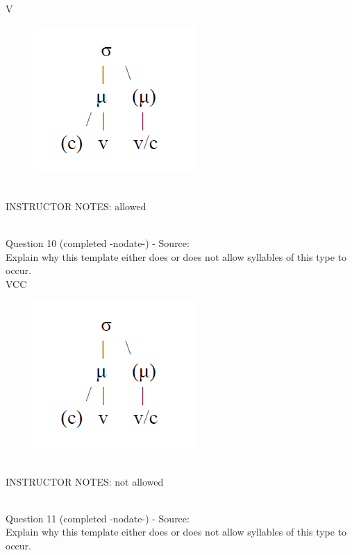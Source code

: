 \documentclass[12pt]{article}
\begin{document}
V

\begin{figure}[H]
\includegraphics{../images/ponapean_syllabletemplate.png}
\end{figure}

~\\
INSTRUCTOR NOTES: allowed


~\\

{\large Question 10} (completed -nodate-) - Source: \\

Explain why this template either does or does not allow syllables of this type to occur.\\

VCC

\begin{figure}[H]
\includegraphics{../images/ponapean_syllabletemplate.png}
\end{figure}

~\\
INSTRUCTOR NOTES: not allowed


~\\

{\large Question 11} (completed -nodate-) - Source: \\

Explain why this template either does or does not allow syllables of this type to occur.\\
\end{document}
